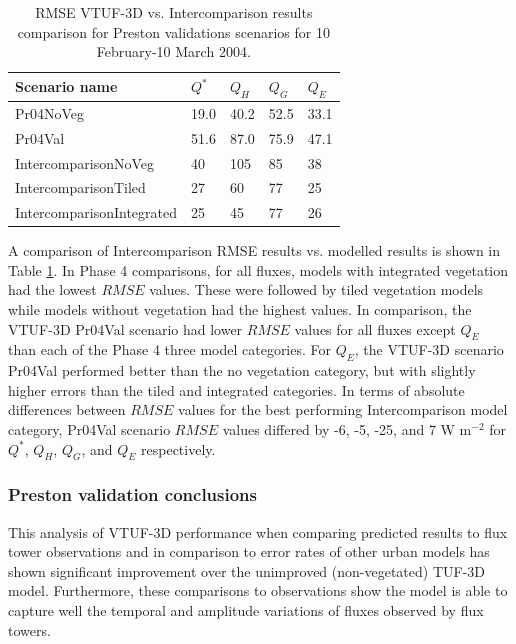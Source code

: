 \documentclass[final,3p,times,authoryear]{elsarticle}
\begin{document}
\begin{center}
\begin{table}[!htbp]
\caption{RMSE VTUF-3D vs. Intercomparison results comparison for Preston validations scenarios for 10 February-10 March 2004.\label{fig:prestonrmse}} 
\begin{tabular}{  | l | l | l|l|l| } 
\hline \textbf{Scenario name} &\textbf{$Q^{*}$}& \textbf{$Q_{H}$}& \textbf{$Q_{G}$}& \textbf{$Q_{E}$}  \\ \hline
Pr04NoVeg & 19.0&	40.2&	52.5&	33.1    \\ \hline
Pr04Val & 51.6&	87.0&	75.9&	47.1  \\ \hline	
IntercomparisonNoVeg & 40&	105&	85&	38   \\ \hline
IntercomparisonTiled &  27&	60&	77&	25  \\ \hline
IntercomparisonIntegrated & 25&	45&	77&	26   \\ \hline
  \end{tabular} 
\end{table}
\end{center} 

A comparison of Intercomparison RMSE results vs. modelled results is shown in Table \ref{fig:prestonrmse}. In Phase 4 comparisons, for all fluxes, models with integrated vegetation had the lowest $RMSE$ values. These were followed by tiled vegetation models while models without vegetation had the highest values. In comparison, the VTUF-3D Pr04Val scenario had lower $RMSE$ values for all fluxes except $Q_{E}$ than each of the Phase 4 three model categories. For $Q_{E}$, the VTUF-3D scenario Pr04Val performed better than the no vegetation category, but with slightly higher errors than the tiled and integrated categories. In terms of absolute differences between $RMSE$ values for the best performing Intercomparison model category, Pr04Val scenario $RMSE$ values differed by -6, -5, -25, and 7 W m$^{-2}$ for $Q^{*}$, $Q_{H}$, $Q_{G}$, and $Q_{E}$ respectively.

\subsubsection{Preston validation conclusions}

This analysis of VTUF-3D performance when comparing predicted results to flux tower observations and in comparison to error rates of other urban models has shown significant improvement over the unimproved (non-vegetated) TUF-3D model. Furthermore, these comparisons to observations show the model is able to capture well the temporal and amplitude variations of fluxes observed by flux towers. 
\end{document}
